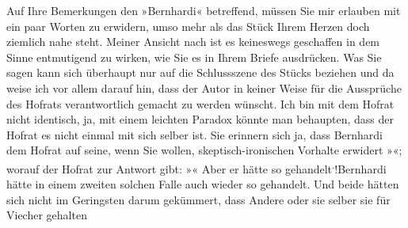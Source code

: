 \pstart
           Auf Ihre Bemerkungen den »Bernhardi« betreffend,
               müssen Sie mir erlauben mit ein paar Worten zu erwidern, umso mehr als das Stück
               Ihrem Herzen doch ziemlich nahe steht. Meiner Ansicht nach ist es keineswegs
               geschaffen in {\pb}dem Sinne entmutigend zu wirken,
               wie Sie es in Ihrem Briefe ausdrücken. Was Sie sagen kann sich überhaupt nur auf die
               Schlussszene des Stücks beziehen und da weise ich vor allem darauf hin, dass der
               Autor in keiner Weise für die Aussprüche des Hofrats verantwortlich gemacht zu werden
               wünscht. Ich bin mit dem Hofrat nicht identisch, ja, mit einem leichten Paradox
               könnte man behaupten, dass der Hofrat es nicht einmal mit sich selber ist. Sie
               erinnern sich ja, dass Bernhardi dem Hofrat auf seine, wenn Sie wollen, skeptisch-ironischen
               Vorhalte erwidert \introOben{}»\introOben{}\label{K_L02222-1v}\label{K_L02222-1}\introOben{}«\introOben{}; worauf der Hofrat zur Antwort gibt: »\label{K_L02222-2v}\label{K_L02222-2}« Aber er hätte so gehandelt\substVorne{}\textsuperscript{.}\substDazwischen{}!\substHinten{}{ }Bernhardi hätte in einem
               zweiten solchen Falle auch wieder so gehandelt. Und beide hätten sich nicht im
               Geringsten darum gekümmert, dass Andere oder sie selber sie für Viecher gehalten
